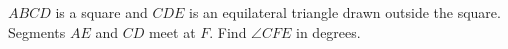 $ABCD$ is a square and $CDE$ is an equilateral triangle drawn outside the square. Segments $AE$ and $CD$ meet at $F$. Find $\angle CFE$ in degrees.
